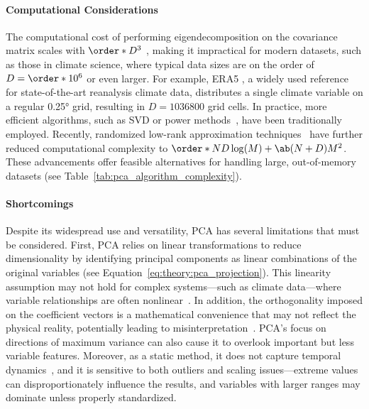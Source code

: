 \paragraph{Computational Considerations} The computational cost of performing eigendecomposition on the covariance matrix scales with $\order*{D^3}$ \cite[e.g.][Section 8.3]{golub_matrix_2013}, making it impractical for modern datasets, such as those in climate science, where typical data sizes are on the order of $D=\order*{10^6}$ or even larger. For example, ERA5 \cite{c3s_era5_hourly_single}, a widely used reference for state-of-the-art reanalysis climate data, distributes a single climate variable on a regular \ang{0.25} grid, resulting in $D=\num{1036800}$ grid cells. In practice, more efficient algorithms, such as SVD or power methods~\cite{golub_matrix_2013}, have been traditionally employed. Recently, randomized low-rank approximation techniques~\cite{drineas_clustering_2004,halko_finding_2011,bogaardt_dataset_2019,erichson_sparse_2020} have further reduced computational complexity to $\order*{ND \log(M) + \ab(N+D)M^2}$. These advancements offer feasible alternatives for handling large, out-of-memory datasets (see Table~\ref{tab:pca_algorithm_complexity}).

\paragraph{Shortcomings} 

Despite its widespread use and versatility, PCA has several limitations that must be considered. First, PCA relies on linear transformations to reduce dimensionality by identifying principal components as linear combinations of the original variables (see Equation~\eqref{eq:theory:pca_projection}). This linearity assumption may not hold for complex systems—such as climate data—where variable relationships are often nonlinear~\cite[e.g.][]{hannachi_bimodality_2019}. In addition, the orthogonality imposed on the coefficient vectors is a mathematical convenience that may not reflect the physical reality, potentially leading to misinterpretation~\cite{richman_rotation_1986}. PCA's focus on directions of maximum variance can also cause it to overlook important but less variable features. Moreover, as a static method, it does not capture temporal dynamics~\cite{farrell_accurate_2001}, and it is sensitive to both outliers and scaling issues---extreme values can disproportionately influence the results, and variables with larger ranges may dominate unless properly standardized.

